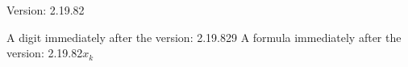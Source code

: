 \documentclass[a4paper, 12pt]{article}
\begin{document}
Version: 2.19.82

A digit immediately after the version: 2.19.829
A formula immediately after the version: 2.19.82$x_k$
\end{document}
